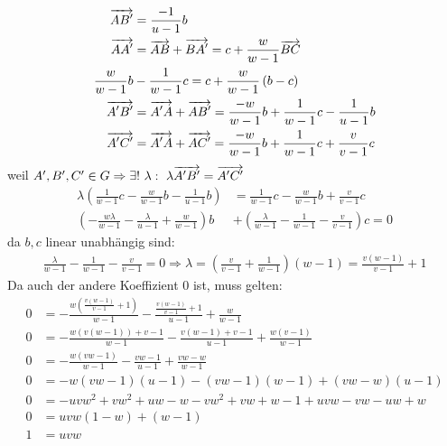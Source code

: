 \begin{mysatz}
\begin{align*}
        \overrightarrow{AB'} & = \frac{-1}{u-1} b\\
        \overrightarrow{AA'} & = \overrightarrow{AB} + \overrightarrow{BA'} = c + \frac{w}{w-1} \overrightarrow{BC}\\
        \frac{w}{w-1} b & - \frac{1}{w-1} c = c + \frac{w}{w-1} \left( b-c \right)\\
        \overrightarrow{A'B'} & = \overrightarrow{A'A} + \overrightarrow{AB'} = \frac{-w}{w-1} b + \frac{1}{w-1} c - \frac{1}{u-1} b\\
        \overrightarrow{A'C'} & = \overrightarrow{A'A} + \overrightarrow{AC'} = \frac{-w}{w-1} b + \frac{1}{w-1} c + \frac{v}{v-1} c
    \end{align*}
    weil $A',B',C' \in G \Rightarrow \exists !\ \lambda :\ \lambda \overrightarrow{A'B'} = \overrightarrow{A'C'}$
    \begin{align*}
        \lambda \left( \frac{1}{w-1}c - \frac{w}{w-1}b - \frac{1}{u-1}b \right) & = \frac{1}{w-1}c - \frac{w}{w-1}b + \frac{v}{v-1}c\\
        \left( -\frac{w \lambda}{w-1} - \frac{\lambda}{u-1} + \frac{w}{w-1} \right)b & + \left( \frac{\lambda}{w-1} - \frac{1}{w-1} - \frac{v}{v-1} \right)c = 0
    \end{align*}
    da $b,c$ linear unabhängig sind:
    \begin{align*}
        \frac{\lambda}{w-1} - \frac{1}{w-1} - \frac{v}{v-1} = 0 \Rightarrow \lambda = \left( \frac{v}{v-1} + \frac{1}{w-1} \right)(w-1) = \frac{v(w-1)}{v-1} +1
    \end{align*}
    Da auch der andere Koeffizient 0 ist, muss gelten:
    \begin{align*}
        0 & = - \frac{w \left( \frac{v(w-1)}{v-1} + 1 \right)}{w-1} - \frac{\frac{v(w-1)}{v-1}+1}{u-1} + \frac{w}{w-1}\\
        0 & = - \frac{w(v(w-1))+ v-1}{w-1} - \frac{v(w-1)+v-1}{u-1} + \frac{w(v-1)}{w-1}\\
        0 & = - \frac{w(vw-1)}{w-1} - \frac{vw-1}{u-1} + \frac{vw-w}{w-1}\\
        0 & = -w(vw-1)(u-1) - (vw-1)(w-1) + (vw-w)(u-1)\\
        0 & = -uvw^2+vw^2+uw-w-vw^2+vw+w-1+uvw-vw-uw+w\\
        0 & = uvw(1-w)+(w-1)\\
        1 & = uvw
    \end{align*}
\end{mysatz}

